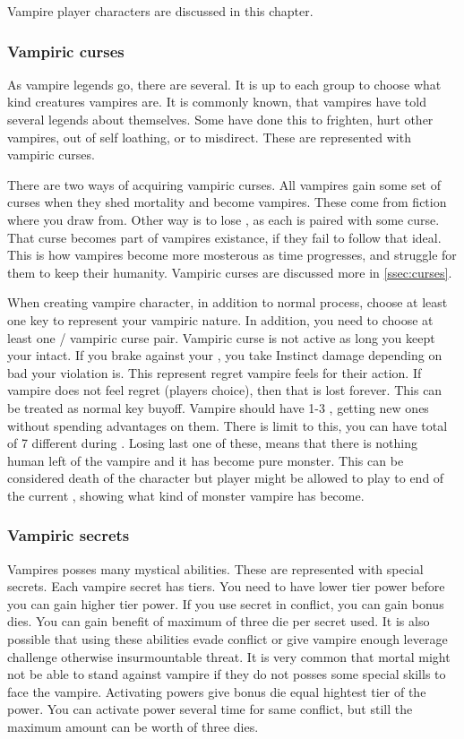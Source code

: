 Vampire player characters are discussed in this chapter.

\subsubsection{Vampiric curses}\label{sssec:vampiric_curses}

As vampire legends go, there are several.
It is up to each group to choose what kind creatures vampires are.
It is commonly known, that vampires have told several legends about themselves.
Some have done this to frighten, hurt other vampires, out of self loathing, or to misdirect.
These are represented with vampiric curses.

There are two ways of acquiring vampiric curses.
All vampires gain some set of curses when they shed mortality and become vampires.
These come from fiction where you draw from.
Other way is to lose \humanity{}, as each \humanity{} is paired with some curse.
That curse becomes part of vampires existance, if they fail to follow that ideal.
This is how vampires become more mosterous as time progresses, and struggle for them to keep their humanity.
Vampiric curses are discussed more in \ref{ssec:curses}.

When creating vampire character, in addition to normal process, choose at least one key to represent your vampiric nature.
In addition, you need to choose at least one \humanity{} / vampiric curse pair.
Vampiric curse is not active as long you keept your \humanity{} intact.
If you brake against your \humanity{}, you take Instinct damage depending on bad your violation is.
This represent regret vampire feels for their action.
If vampire does not feel regret (players choice), then that \humanity{} is lost forever.
This can be treated as normal key buyoff.
Vampire should have 1-3 \humanities{}, getting new ones without spending advantages on them.
There is limit to this, you can have total of 7 different \humanities{} during \campaign{}.
Losing last one of these, means that there is nothing human left of the vampire and it has become pure monster.
This can be considered death of the character but player might be allowed to play to end of the current \session{}, showing what kind of monster vampire has become.

\subsubsection{Vampiric secrets}\label{sssec:vampiric_secrets}
Vampires posses many mystical abilities.
These are represented with special secrets.
Each vampire secret has tiers.
You need to have lower tier power before you can gain higher tier power.
If you use secret in conflict, you can gain bonus dies.
You can gain benefit of maximum of three die per secret used.
It is also possible that using these abilities evade conflict or give vampire enough leverage challenge otherwise insurmountable threat.
It is very common that mortal might not be able to stand against vampire if they do not posses some special skills to face the vampire.
Activating powers give bonus die equal hightest tier of the power.
You can activate power several time for same conflict, but still the maximum amount can be worth of three dies.

